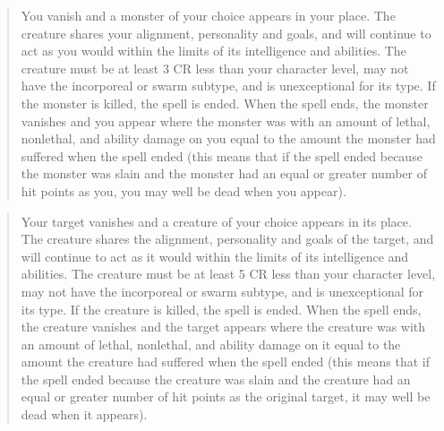 \begin{quote}
\begin{small}
\end{small}

You vanish and a monster of your choice appears in your place. The creature shares your alignment, personality and goals, and will continue to act as you would within the limits of its intelligence and abilities. The creature must be at least 3 CR less than your character level, may not have the incorporeal or swarm subtype, and is unexceptional for its type. If the monster is killed, the spell is ended. When the spell ends, the monster vanishes and you appear where the monster was with an amount of lethal, nonlethal, and ability damage on you equal to the amount the monster had suffered when the spell ended (this means that if the spell ended because the monster was slain and the monster had an equal or greater number of hit points as you, you may well be dead when you appear).
\end{quote}

\begin{quote}
\begin{small}
\end{small}

Your target vanishes and a creature of your choice appears in its place. The creature shares the alignment, personality and goals of the target, and will continue to act as it would within the limits of its intelligence and abilities. The creature must be at least 5 CR less than your character level, may not have the incorporeal or swarm subtype, and is unexceptional for its type. If the creature is killed, the spell is ended. When the spell ends, the creature vanishes and the target appears where the creature was with an amount of lethal, nonlethal, and ability damage on it equal to the amount the creature had suffered when the spell ended (this means that if the spell ended because the creature was slain and the creature had an equal or greater number of hit points as the original target, it may well be dead when it appears).

\end{quote}


